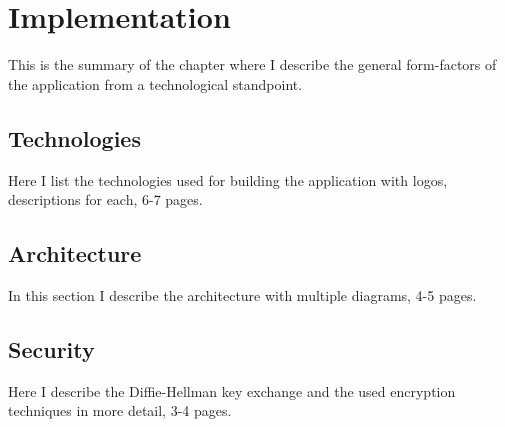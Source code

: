 \chapter{Implementation}\label{ch:IMPLEMENTATION}

\begin{summary}
	This is the summary of the chapter where I describe the general form-factors of the application from a technological standpoint.
\end{summary}

\section{Technologies}
Here I list the technologies used for building the application with logos, descriptions for each, 6-7 pages.

\section{Architecture}
In this section I describe the architecture with multiple diagrams, 4-5 pages.

\section{Security}
Here I describe the Diffie-Hellman key exchange and the used encryption techniques in more detail, 3-4 pages.